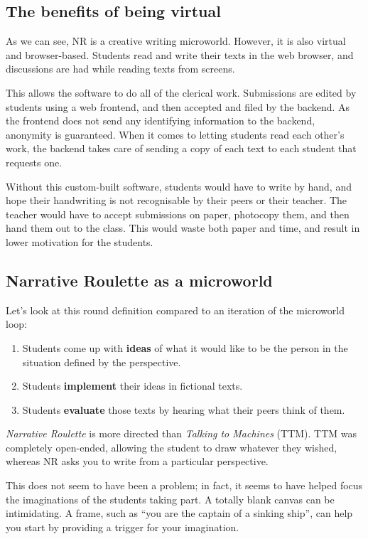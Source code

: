 \subsection{The benefits of being virtual}

As we can see, NR is a creative writing microworld. However, it is also
virtual and browser-based. Students read and write their texts in the
web browser, and discussions are had while reading texts from screens.

This allows the software to do all of the clerical work. Submissions are
edited by students using a web frontend, and then accepted and filed by
the backend. As the frontend does not send any identifying information
to the backend, anonymity is guaranteed. When it comes to letting
students read each other's work, the backend takes care of sending a
copy of each text to each student that requests one.

Without this custom-built software, students would have to write by
hand, and hope their handwriting is not recognisable by their peers or
their teacher. The teacher would have to accept submissions on paper,
photocopy them, and then hand them out to the class. This would waste
both paper and time, and result in lower motivation for the students.

\subsection{Narrative Roulette as a microworld}

Let's look at this round definition compared to an iteration of the
microworld loop: 

\begin{enumerate}
\item Students come up with \textbf{ideas} of what it would like to be the person in the situation defined by the perspective.
\item Students \textbf{implement} their ideas in fictional texts. 
\item Students \textbf{evaluate} those texts by hearing what their peers think
of them.
\end{enumerate}

\emph{Narrative Roulette} is more directed than \emph{Talking to
Machines} (TTM). TTM was completely open-ended, allowing the student to
draw whatever they wished, whereas NR asks you to write from a
particular perspective.

This does not seem to have been a problem; in fact, it seems to have
helped focus the imaginations of the students taking part. A totally
blank canvas can be intimidating. A frame, such as ``you are the captain
of a sinking ship'', can help you start by providing a trigger for your imagination.

